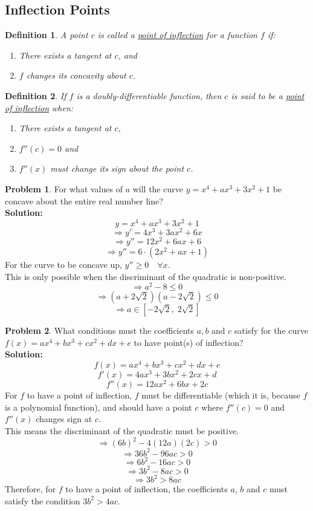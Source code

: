 \documentclass[14]{article}
\newtheorem{define}{Definition}
\theoremstyle{definition}
\newtheorem{prob}{Problem}
\theoremstyle{case}
\begin{document}
\subsection{Inflection Points}
\begin{define}
A point $c$ is called a \underline{point of inflection} for a function $f$ if:
\begin{enumerate}
\item There exists a tangent at $c$, and
\item $f$ changes its concavity about $c$.
\end{enumerate}
\end{define}
\begin{define}
If $f$ is a doubly-differentiable function, then $c$ is said to be a \underline{point of inflection} when:
\begin{enumerate}
\item There exists a tangent at $c$,
\item $f''(c) = 0$ and
\item $f''(x)$ must change its sign about the point $c$.
\end{enumerate}
\end{define}
\pagebreak
\begin{prob}
For what values of $a$ will the curve $y = x^4 + ax^3 + 3x^2 + 1$ be concave about the entire real number line?\\
\textbf{Solution:}
\[y = x^4 + ax^3 + 3x^2 + 1\]
\[\Rightarrow y' = 4x^3 + 3ax^2 + 6x\]
\[\Rightarrow y'' = 12x^2 + 6ax + 6\]
\[\Rightarrow y'' = 6 \cdot (2x^2 + ax + 1)\]
For the curve to be concave up, $y'' \geq 0 \quad \forall x$.\\
This is only possible when the discriminant of the quadratic is non-positive.\\
\[\Rightarrow a^2 - 8 \leq 0\]
\[\Rightarrow \left(a + 2\sqrt2\right)\left(a - 2\sqrt2\right) \leq 0\]
\[\Rightarrow a \in \left[-2\sqrt2,\; 2\sqrt2\right]\]
\end{prob}
\begin{prob}
What conditions must the coefficients $a, b$ and $c$ satisfy for the curve $f(x) = ax^4 + bx^3 + cx^2 + dx + e$ to have point(s) of inflection?\\
\textbf{Solution:}\\
\[f(x) = ax^4 + bx^3 + cx^2 + dx + e\]
\[f'(x) = 4ax^3 + 3bx^2 + 2cx + d\]
\[f''(x) = 12ax^2 + 6bx + 2c\]
For $f$ to have a point of inflection, $f$ must be differentiable (which it is, because $f$ is a polynomial function), and should have a point $c$ where $f''(c) = 0$ and $f''(x)$ changes sign at $c$.\\
This means the discriminant of the quadratic must be positive.
\[\Rightarrow (6b)^2 - 4(12a)(2c) > 0\]
\[\Rightarrow 36b^2 - 96ac > 0\]
\[\Rightarrow 6b^2 - 16ac > 0\]
\[\Rightarrow 3b^2 - 8ac > 0\]
\[\Rightarrow 3b^2 > 8ac\]
Therefore, for $f$ to have a point of inflection, the coefficients $a$, $b$ and $c$ must satisfy the condition $3b^2 > 4ac$.
\end{prob}
\pagebreak
\end{document}
